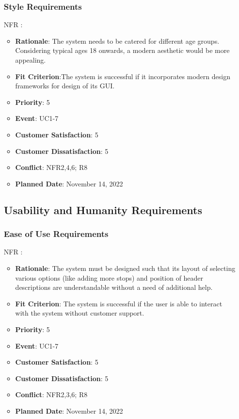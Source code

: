 \documentclass[12pt, titlepage]{article}
\newcounter{reqnum} %
\newcounter{freqnum} %
\begin{document}
\begin{itemize}
\subsubsection{Style Requirements}
\item[NFR\refstepcounter{freqnum}\thefreqnum
\label{NFR}:] 
\begin{itemize}
    \item \textbf{Rationale}: The system needs to be catered for different age groups. Considering typical ages 18 onwards, a modern aesthetic would be more appealing.
    \item \textbf{Fit Criterion}:The system is successful if it incorporates modern design frameworks for design of its GUI.
    \item \textbf{Priority}: 5
    \item \textbf{Event}: UC1-7 %
    \item \textbf{Customer Satisfaction}: 5
    \item \textbf{Customer Dissatisfaction}: 5
    \item \textbf{Conflict}: NFR2,4,6; R8
    \item \textbf{Planned Date}: November 14, 2022
\end{itemize}
\subsection{Usability and Humanity Requirements}

\subsubsection{Ease of Use Requirements}

\item[NFR\refstepcounter{freqnum}\thefreqnum
\label{NFR}:] 
\begin{itemize}
    \item \textbf{Rationale}: The system must be designed such that its layout of selecting various options (like adding more stops) and position of header descriptions are understandable without a need of additional help.
    \item \textbf{Fit Criterion}: The system is successful if the user is able to interact with the system without customer support.
    \item \textbf{Priority}: 5
    \item \textbf{Event}: UC1-7%
    \item \textbf{Customer Satisfaction}: 5
    \item \textbf{Customer Dissatisfaction}: 5
    \item \textbf{Conflict}: NFR2,3,6; R8
    \item \textbf{Planned Date}: November 14, 2022
\end{itemize}

\end{itemize}
\end{document}
